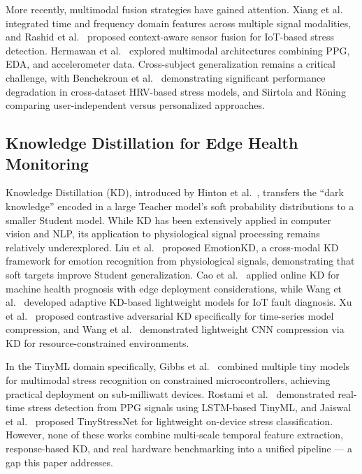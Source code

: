 \documentclass[conference]{IEEEtran}
\begin{document}
More recently, multimodal fusion strategies have gained attention. Xiang et al.~\cite{xiang2025multi} integrated time and frequency domain features across multiple signal modalities, and Rashid et al.~\cite{rashid2023stress} proposed context-aware sensor fusion for IoT-based stress detection. Hermawan et al.~\cite{hermawan2025multimodal} explored multimodal architectures combining PPG, EDA, and accelerometer data. Cross-subject generalization remains a critical challenge, with Benchekroun et al.~\cite{benchekroun2023cross} demonstrating significant performance degradation in cross-dataset HRV-based stress models, and Siirtola and R\"oning~\cite{siirtola2020comparison} comparing user-independent versus personalized approaches.

\subsection{Knowledge Distillation for Edge Health Monitoring}

Knowledge Distillation (KD), introduced by Hinton et al.~\cite{hinton2015distilling}, transfers the ``dark knowledge'' encoded in a large Teacher model's soft probability distributions to a smaller Student model. While KD has been extensively applied in computer vision and NLP, its application to physiological signal processing remains relatively underexplored. Liu et al.~\cite{liu2023emotionkd} proposed EmotionKD, a cross-modal KD framework for emotion recognition from physiological signals, demonstrating that soft targets improve Student generalization. Cao et al.~\cite{cao2024online} applied online KD for machine health prognosis with edge deployment considerations, while Wang et al.~\cite{wang2024adaptive} developed adaptive KD-based lightweight models for IoT fault diagnosis. Xu et al.~\cite{xu2022contrastive} proposed contrastive adversarial KD specifically for time-series model compression, and Wang et al.~\cite{wang2024lightweight} demonstrated lightweight CNN compression via KD for resource-constrained environments.

In the TinyML domain specifically, Gibbs et al.~\cite{gibbs2023combining} combined multiple tiny models for multimodal stress recognition on constrained microcontrollers, achieving practical deployment on sub-milliwatt devices. Rostami et al.~\cite{rostami2025real} demonstrated real-time stress detection from PPG signals using LSTM-based TinyML, and Jaiswal et al.~\cite{jaiswal2024tinystressnet} proposed TinyStressNet for lightweight on-device stress classification. However, none of these works combine multi-scale temporal feature extraction, response-based KD, and real hardware benchmarking into a unified pipeline --- a gap this paper addresses.
\end{document}
